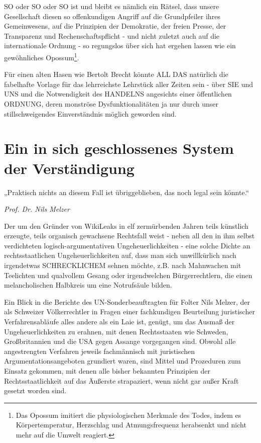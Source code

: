 \begin{multicols}{2}
SO oder SO oder SO ist und bleibt es nämlich ein Rätsel,
dass unsere Gesellschaft diesen so offenkundigen Angriff
auf die Grundpfeiler ihres Gemeinwesens, auf die Prinzipien der Demokratie, der freien Presse, der Transparenz
und Rechenschaftspflicht - und nicht zuletzt auch auf
die internationale Ordnung - so regungslos über sich hat
ergehen lassen wie ein gewöhnliches 
Opossum\footnote[24]{Das Opossum imitiert die physiologischen Merkmale des Todes, indem es Körpertemperatur, Herzschlag und Atmungsfrequenz herabsenkt und nicht mehr auf die Umwelt reagiert.}.

Für einen alten Hasen wie Bertolt Brecht könnte ALL
DAS natürlich die fabelhafte Vorlage für das lehrreichste
Lehrstück aller Zeiten sein - über SIE und UNS und die
Notwendigkeit des HANDELNS angesichts einer öffentlichen ORDNUNG, deren monströse Dysfunktionalitäten ja nur durch unser stillschweigendes Einverständnis
möglich geworden sind.



\chapter{Ein in sich geschlossenes System der Verständigung} %

\epigraph{„Praktisch nichts an diesem Fall ist übriggeblieben, das noch legal sein könnte.“}{\textit{Prof. Dr. Nils Melzer}}

Der um den Gründer von WikiLeaks in elf zermürbenden Jahren teils künstlich erzeugte, teils organisch gewachsene Rechtsfall weist - neben all den in ihm selbst
verdichteten logisch-argumentativen Ungeheuerlichkeiten - eine solche Dichte an rechtsstaatlichen Ungeheuerlichkeiten auf, dass man sich unwillkürlich nach
irgendetwas SCHRECKLICHEM sehnen möchte, z.B.
nach Mahnwachen mit Teelichten und qualvollem Gesang oder irgendwelchen Bürgerrechtlern, die einen melancholischen Halbkreis um eine Notrufsäule bilden.

Ein Blick in die Berichte des UN-Sonderbeauftragten für
Folter Nils Melzer, der als Schweizer Völkerrechtler in
Fragen einer fachkundigen Beurteilung juristischer Verfahrensabläufe alles andere als ein Laie ist, genügt, um
das Ausmaß der Ungeheuerlichkeiten zu erahnen, mit
denen Rechtsstaaten wie Schweden, Großbritannien
und die USA gegen Assange vorgegangen sind. Obwohl
alle angestrengten Verfahren jeweils fachmännisch mit
juristischen Argumentationsangeboten grundiert waren, sind Mittel und Prozeduren zum Einsatz gekommen, mit denen alle bisher bekannten Prinzipien der
Rechtsstaatlichkeit auf das Äußerste strapaziert, wenn
nicht gar außer Kraft gesetzt worden sind.


\end{multicols}
